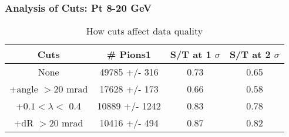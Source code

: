 \frame
{
\frametitle{Analysis of Cuts: Pt 8-20 GeV}
\begin{table}
\caption{How cuts affect data quality}
\centering
\begin{tabular}{c c c c}
\hline\hline
Cuts & \# Pions1 & S/T at 1 $\sigma$ & S/T at 2 $\sigma$ \\ [0.5ex]
\hline
None & 49785 +/-  316 & 0.73 & 0.65 \\ %
+angle $> 20$ mrad & 17628 +/-  173 & 0.66 & 0.58 \\ %
+$0.1 < \lambda <$ 0.4 & 10889 +/- 1242 & 0.83 & 0.78 \\ %
+dR $> 20$ mrad & 10416 +/-  494 & 0.87 & 0.82 \\ %
[1ex]
\hline
\end{tabular}
\label{table:nonlin}
\end{table}
}
